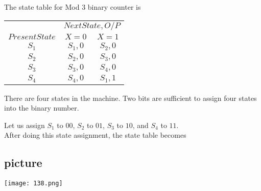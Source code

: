 \documentclass[9pt]{beamer}
\begin{document}
\begin{frame}
The state table for Mod 3 binary counter is

\vspace*{0.3cm}
\begin{center}
\begin{tabular}{ccc}
 \hline

 \hline

 \hline

 \hline
 & \multicolumn{2}{c}{$Next State, O/P$}\\
 \cline{2-3}
 $Present State$ &  $X=0$ & $X=1$\\
\hline
 $S_1$    &    $S_1,0$    &   $S_2,0$  \\
 $S_2$    &    $S_2,0$    &   $S_3,0$  \\
 $S_3$    &    $S_3,0$    &   $S_4,0$  \\
 $S_4$    &    $S_4,0$    &   $S_1,1$  \\

 \hline

 \hline

 \hline

 \hline
\end{tabular}
\end{center}

\vspace*{0.3cm}
 \hspace*{0.2cm} There are four states in the machine. Two bits are sufficient to assign four states into the binary
number.\\
\end{frame}

\begin{frame}
 \hspace*{0.2cm} Let us assign $S_1$ to $00$, $S_2$ to $01$, $S_3$ to $10$, and $S_4$ to $11$.\\
 \hspace*{0.2cm} After doing this state assignment, the state table becomes\\

\vspace*{0.3cm}
\pause
\begin{center}
\section{picture}
\texttt{[image: 138.png]}
\end{center}
\end{frame}
\end{document}
